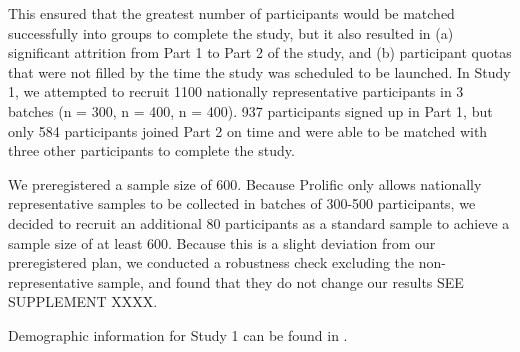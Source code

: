 \documentclass[12pt,]{article}
\begin{document}
This ensured that the greatest number of participants would be matched successfully into groups to complete the study, but it also resulted in (a) significant attrition from Part 1 to Part 2 of the study, and (b) participant quotas that were not filled by the time the study was scheduled to be launched. In Study 1,  we attempted to recruit 1100 nationally representative participants in 3 batches (n = 300, n = 400, n = 400). 937 participants signed up in Part 1, but only 584 participants joined Part 2 on time and were able to be matched with three other participants to complete the study.  

We preregistered a sample size of 600. Because Prolific only allows nationally representative samples to be collected in batches of 300-500 participants, we decided to recruit an additional 80 participants as a standard sample to achieve a sample size of at least 600. Because this is a slight deviation from our preregistered plan, we conducted a robustness check excluding the non-representative sample, and found that they do not change our results SEE SUPPLEMENT XXXX.  

Demographic information for Study 1 can be found in .  

\clearpage
\end{document}
